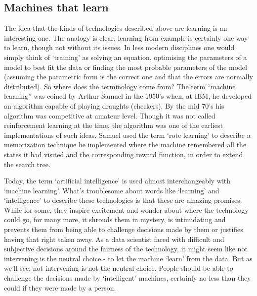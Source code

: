 \subsection{Machines that learn}

The idea that the kinds of technologies described above are learning is an interesting one. The analogy is clear, learning from example is certainly one way to learn, though not without its issues. In less modern disciplines one would simply think of `training' as solving an equation, optimising the parameters of a model to best fit the data or finding the most probable parameters of the model (assuming the parametric form is the correct one and that the errors are normally distributed). So where does the terminology come from? The term ``machine learning'' was coined by Arthur Samuel in the 1950's when, at IBM, he developed an algorithm capable of playing draughts (checkers). By the mid 70's his algorithm was competitive at amateur level. Though it was not called reinforcement learning at the time, the algorithm was one of the earliest implementations of such ideas. Samuel used the term `rote learning' to describe a memorization technique he implemented where the machine remembered all the states it had visited and the corresponding reward function, in order to extend the search tree.

Today, the term `artificial intelligence' is used almost interchangeably with `machine learning'. What's troublesome about words like `learning' and `intelligence' to describe these technologies is that these are amazing promises. While for some, they inspire excitement and wonder about where the technology could go, for many more, it shrouds them in mystery, is intimidating and prevents them from being able to challenge decisions made by them or justifies having that right taken away. As a data scientist faced with difficult and subjective decisions around the fairness of the technology, it might seem like not intervening is the neutral choice - to let the machine ‘learn’ from the data. But as we’ll see, not intervening is not the neutral choice. People should be able to challenge the decisions made by `intelligent' machines, certainly no less than they could if they were made by a person.

